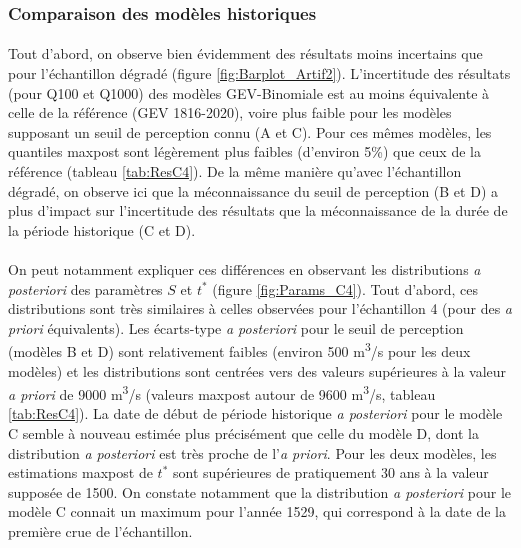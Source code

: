 		\subsubsection{Comparaison des modèles historiques}
		
		
	\paragraph{} Tout d'abord, on observe bien évidemment des résultats moins incertains que pour l'échantillon dégradé (figure \ref{fig:Barplot_Artif2}). L'incertitude des résultats (pour Q100 et Q1000) des modèles GEV-Binomiale est au moins équivalente à celle de la référence (GEV 1816-2020), voire plus faible pour les modèles supposant un seuil de perception connu (A et C). Pour ces mêmes modèles, les quantiles maxpost sont légèrement plus faibles (d'environ 5\%) que ceux de la référence (tableau \ref{tab:ResC4}). De la même manière qu'avec l'échantillon dégradé, on observe ici que la méconnaissance du seuil de perception (B et D) a plus d'impact sur l'incertitude des résultats que la méconnaissance de la durée de la période historique (C et D). 
	
	\paragraph{} On peut notamment expliquer ces différences en observant les distributions \textit{a posteriori} des paramètres $S$ et $t^{*}$ (figure \ref{fig:Params_C4}). Tout d'abord, ces distributions sont très similaires à celles observées pour l'échantillon 4 (pour des \textit{a priori} équivalents). Les écarts-type \textit{a posteriori} pour le seuil de perception (modèles B et D) sont relativement faibles (environ 500 m\textsuperscript{3}/s pour les deux modèles) et les distributions sont centrées vers des valeurs supérieures à la valeur \textit{a priori} de 9000 m\textsuperscript{3}/s (valeurs maxpost autour de 9600 m\textsuperscript{3}/s, tableau \ref{tab:ResC4}). La date de début de période historique \textit{a posteriori} pour le modèle C semble à nouveau estimée plus précisément que celle du modèle D, dont la distribution \textit{a posteriori} est très proche de l'\textit{a priori}. Pour les deux modèles, les estimations maxpost de $t^*$ sont supérieures de pratiquement 30 ans à la valeur supposée de 1500. On constate notamment que la distribution \textit{a posteriori} pour le modèle C connait un maximum pour l'année 1529, qui correspond à la date de la première crue de l'échantillon. 
	
